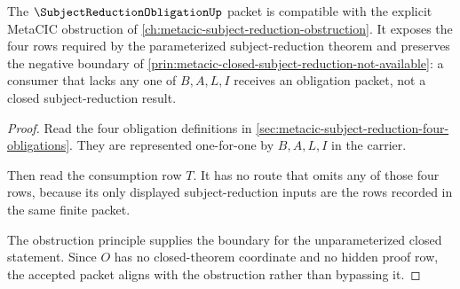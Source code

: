 \begin{theorem}
\label{thm:subject-reduction-obligation-obstruction-alignment}
The $\SubjectReductionObligationUp$ packet is compatible with the explicit MetaCIC obstruction of \autoref{ch:metacic-subject-reduction-obstruction}. It exposes the four rows required by the parameterized subject-reduction theorem and preserves the negative boundary of \autoref{prin:metacic-closed-subject-reduction-not-available}: a consumer that lacks any one of $B,A,L,I$ receives an obligation packet, not a closed subject-reduction result.
\end{theorem}
\begin{proof}
Read the four obligation definitions in \autoref{sec:metacic-subject-reduction-four-obligations}. They are represented one-for-one by $B,A,L,I$ in the carrier.

Then read the consumption row $T$. It has no route that omits any of those four rows, because its only displayed subject-reduction inputs are the rows recorded in the same finite packet.

The obstruction principle supplies the boundary for the unparameterized closed statement. Since $O$ has no closed-theorem coordinate and no hidden proof row, the accepted packet aligns with the obstruction rather than bypassing it.
\end{proof}


\begin{closurestatus}{\SubjectReductionObligationUp}
  \theoryclosure{\seedClosure}
  \formalstatus{\unformalizedV}
\end{closurestatus}
